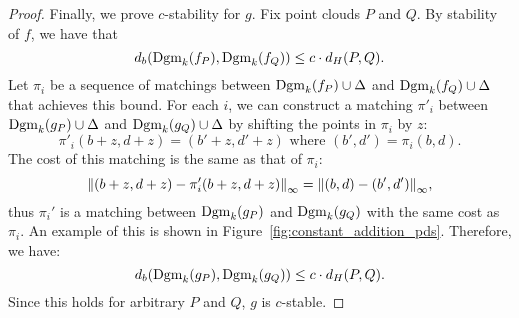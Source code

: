 \begin{proof}
    Finally, we prove $c$-stability for $g$.
    Fix point clouds $P$ and $Q$.
    By stability of $f$, we have that
    \begin{equation}
        d_b(\operatorname{Dgm}_k(f_P), \operatorname{Dgm}_k(f_Q)) \leq c \cdot d_H(P, Q).
    \end{equation}
    Let $\pi_i$ be a sequence of matchings between $\operatorname{Dgm}_k(f_P) \cup \Delta$ and
    $\operatorname{Dgm}_k(f_Q) \cup \Delta$ that achieves this bound.
    For each $i$, we can construct a matching $\pi'_i$ between
    $\operatorname{Dgm}_k(g_P) \cup \Delta$ and $\operatorname{Dgm}_k(g_Q) \cup \Delta$ by shifting the
    points in $\pi_i$ by $z$:
    \begin{equation}
        \pi'_i(b + z, d + z) = (b' + z, d' + z) \text{ where } (b', d') = \pi_i(b, d).
    \end{equation}
    The cost of this matching is the same as that of $\pi_i$:
    \begin{equation}
        \norm{(b + z, d + z) - \pi'_i(b + z, d + z)}_\infty = \norm{(b, d) - (b', d')}_\infty,
    \end{equation}
    thus $\pi_i'$ is a matching between $\operatorname{Dgm}_k(g_P)$ and $\operatorname{Dgm}_k(g_Q)$ with the same
    cost as $\pi_i$. An example of this is shown in
    Figure~\ref{fig:constant_addition_pds}.
    Therefore, we have:
    \begin{equation}
        d_b(\operatorname{Dgm}_k(g_P), \operatorname{Dgm}_k(g_Q)) \leq c \cdot d_H(P, Q).
    \end{equation}
    Since this holds for arbitrary $P$ and $Q$, $g$ is $c$-stable.
\end{proof}

